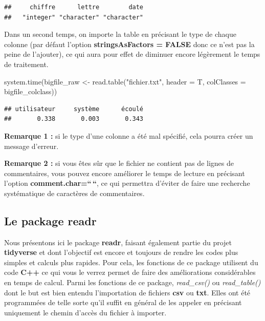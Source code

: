 \documentclass[
]{book}
\newenvironment{Shaded}{\begin{snugshade}}{\end{snugshade}}
\newcommand{\AttributeTok}[1]{\textcolor[rgb]{0.77,0.63,0.00}{#1}}
\newcommand{\FunctionTok}[1]{\textcolor[rgb]{0.00,0.00,0.00}{#1}}
\newcommand{\NormalTok}[1]{#1}
\newcommand{\OtherTok}[1]{\textcolor[rgb]{0.56,0.35,0.01}{#1}}
\newcommand{\StringTok}[1]{\textcolor[rgb]{0.31,0.60,0.02}{#1}}
\theoremstyle{definition}
\theoremstyle{definition}
\theoremstyle{definition}
\theoremstyle{definition}
\theoremstyle{remark}
\begin{document}
\begin{verbatim}
##     chiffre      lettre        date 
##   "integer" "character" "character"
\end{verbatim}

Dans un second temps, on importe la table en précisant le type de chaque colonne (par défaut l'option \textbf{stringsAsFactors = FALSE} donc ce n'est pas la peine de l'ajouter), ce qui aura pour effet de diminuer encore légèrement le temps de traitement.

\begin{Shaded}
\begin{Highlighting}[]
\FunctionTok{system.time}\NormalTok{(bigfile\_raw }\OtherTok{\textless{}{-}} \FunctionTok{read.table}\NormalTok{(}\StringTok{"fichier.txt"}\NormalTok{, }\AttributeTok{header =}\NormalTok{ T, }
                    \AttributeTok{colClasses =}\NormalTok{ bigfile\_colclass)) }
\end{Highlighting}
\end{Shaded}

\begin{verbatim}
## utilisateur     système      écoulé 
##       0.338       0.003       0.343
\end{verbatim}

\textbf{Remarque 1 :} si le type d'une colonne a été mal spécifié, cela pourra créer un message d'erreur.

\textbf{Remarque 2 :} si vous êtes sûr que le fichier ne contient pas de lignes de commentaires, vous pouvez encore améliorer le temps de lecture en précisant l'option \textbf{comment.char=``\,``}, ce qui permettra d'éviter de faire une recherche systématique de caractères de commentaires.

\hypertarget{le-package-readr}{%
\subsection{\texorpdfstring{Le package \textbf{readr}}{Le package readr}}\label{le-package-readr}}

Nous présentons ici le package \textbf{readr}, faisant également partie du projet \textbf{tidyverse} et dont l'objectif est encore et toujours de rendre les codes plus simples et calculs plus rapides. Pour cela, les fonctions de ce package utilisent du code \textbf{C++} ce qui vous le verrez permet de faire des améliorations considérables en temps de calcul. Parmi les fonctions de ce package, \emph{read\_csv()} ou \emph{read\_table()} dont le but est bien entendu l'importation de fichiers \textbf{csv} ou \textbf{txt}. Elles ont été programmées de telle sorte qu'il suffit en général de les appeler en précisant uniquement le chemin d'accès du fichier à importer.
\end{document}
